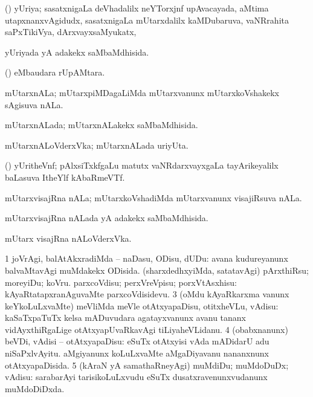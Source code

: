 {{\bentry
{} 
\gl{\nA}
\expl{}
\bmng
(\jiVra) yUriya; sasatxnigaLa deVhadalilx neYTorxjnf upAvacayada, aMtima utapxnanxvAgidudx, sasatxnigaLa mUtarxdalilx kaMDubaruva, vaNRrahita saPxTikiVya, dArxvayxsaMyukatx,  
\emng
\eentry

\bentry
{} 
\gl{\gu}
\expl{}
\bmng
yUriyada yA adakekx saMbaMdhisida. 
\emng
\eentry

\bentry
{} 
\gl{\nA}
\expl{}
\bmng
(\ame)  eMbaudara rUpAMtara. 
\emng
\eentry

\bentry
{} 
\gl{\nA}
\expl{}
\bmng
mUtarxnALa; mUtarxpiMDagaLiMda mUtarxvanunx mUtarxkoVshakekx sAgisuva nALa. 
\emng
\eentry

\bentry
{} 
\gl{\gu}
\expl{}
\bmng
mUtarxnALada; mUtarxnALakekx saMbaMdhisida. 
\emng
\eentry

\bentry
{} 
\gl{\gu}
\expl{}
\bmng
{} 
\emng
\eentry

\bentry
{} 
\gl{\nA}
\expl{}
\bmng
mUtarxnALoVderxVka; mUtarxnALada uriyUta. 
\emng
\eentry

\bentry
{} 
\gl{\nA}
\expl{}
\bmng
(\ravi) yUritheVnf; pAlxsiTxkfgaLu matutx vaNRdarxvayxgaLa tayArikeyalilx baLasuva ItheYlf kAbaRmeVTf. 
\emng
\eentry

\bentry
{} 
\gl{\nA}
\bmng
mUtarxvisajRna nALa; mUtarxkoVshadiMda mUtarxvanunx visajiRsuva nALa. 
\emng
\eentry

\bentry
{} 
\gl{\gu}
\expl{}
\bmng
mUtarxvisajRna nALada yA adakekx saMbaMdhisida. 
\emng
\eentry

\bentry
{} 
\gl{\nA}
\expl{}
\bmng
mUtarx visajRna nALoVderxVka. 
\emng
\eentry

\bentry
{} 
\gl{\sakirx}
\expl{}
\bmng
\bnum
\num{1} joVrAgi, balAtAkxradiMda -- naDasu, ODisu, dUDu:  avana kudureyanunx balvaMtavAgi muMdakekx ODisida. 
 (sharxdedhxyiMda, satatavAgi) 
\banum
{} pArxthiRsu; moreyiDu; koVru. 
 parxcoVdisu; perxVreVpisu; porxVtAsxhisu:  kAyaRtatapxranAguvaMte parxcoVdisidevu. 
\eanum
\numie
\num{3} (oMdu kAyaRkarxma \mo vanunx keYkoLuLxvaMte) meVliMda meVle otAtxyapaDisu, otitxheVLu, vAdisu:  kaSaTxpaTuTx kelsa mADuvudara agatayxvanunx avanu tananx vidAyxthiRgaLige otAtxyapUvaRkavAgi tiLiyaheVLidanu. 
\num{4} (obabxnanunx) beVDi, vAdisi -- otAtxyapaDisu:  eSuTx otAtxyisi vAda mADidarU adu niSaPxlvAyitu.  aMgiyanunx koLuLxvaMte aMgaDiyavanu nananxnunx otAtxyapaDisida. 
\num{5} (kAraN yA samathaRneyAgi) muMdiDu; muMdoDuDx; vAdisu:  sarabarAyi tarisikoLuLxvudu eSuTx dusatxravenunxvudanunx muMdoDiDxda. 
\enum
\emng

}}
